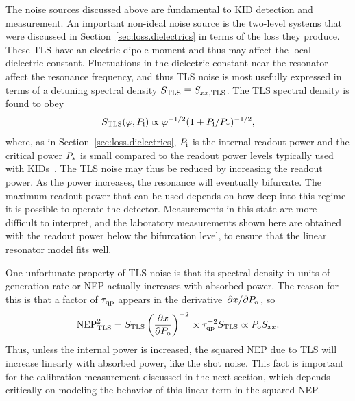 The noise sources discussed above are fundamental to KID detection and measurement.
An important non-ideal noise source is the two-level systems that were discussed in Section~\ref{sec:loss.dielectrics} in terms of the loss they produce.
These TLS have an electric dipole moment and thus may affect the local dielectric constant.
Fluctuations in the dielectric constant near the resonator affect the resonance frequency, and thus TLS noise is most usefully expressed in terms of a detuning spectral density
$S_{\mathrm{TLS}} \equiv S_{x x, \mathrm{TLS}}$.
The TLS spectral density is found to obey
\begin{equation*}
S_{\mathrm{TLS}}(\varphi, P_{\mathrm{i}})
  \propto
  \varphi^{-1/2} (1 + P_{\mathrm{i}} / P_*)^{-1/2},
\label{eqn:spectraldensity_tls}
\end{equation*}
where, as in Section~\ref{sec:loss.dielectrics}, $P_{\mathrm{i}}$ is the internal readout power and the critical power $P_*$ is small compared to the readout power levels typically used with KIDs~\autocite{Gao2007APL,Gao2008bAPL,Barends2010APL,Zmuidzinas2012ARCMP,Neill2013APL}.
The TLS noise may thus be reduced by increasing the readout power.
As the power increases, the resonance will eventually bifurcate.
The maximum readout power that can be used depends on how deep into this regime it is possible to operate the detector.
Measurements in this state are more difficult to interpret, and the laboratory measurements shown here are obtained with the readout power below the bifurcation level, to ensure that the linear resonator model fits well.

One unfortunate property of TLS noise is that its spectral density in units of generation rate or NEP actually increases with absorbed power.
The reason for this is that a factor of $\tau_{\mathrm{qp}}$ appears in the derivative
$\pdv*{x}{P_{\mathrm{o}}}$,
so
\begin{equation}
\mathrm{NEP}_{\mathrm{TLS}}^2
  =
  S_{\mathrm{TLS}}
  \left( \pdv{x}{P_{\mathrm{o}}} \right)^{-2}
  \propto
  \tau_{\mathrm{qp}}^{-2} S_{\mathrm{TLS}}
  \propto
  P_{\mathrm{o}} S_{x x}.
\end{equation}
Thus, unless the internal power is increased, the squared NEP due to TLS will increase linearly with absorbed power, like the shot noise.
This fact is important for the calibration measurement discussed in the next section, which depends critically on modeling the behavior of this linear term in the squared NEP.


